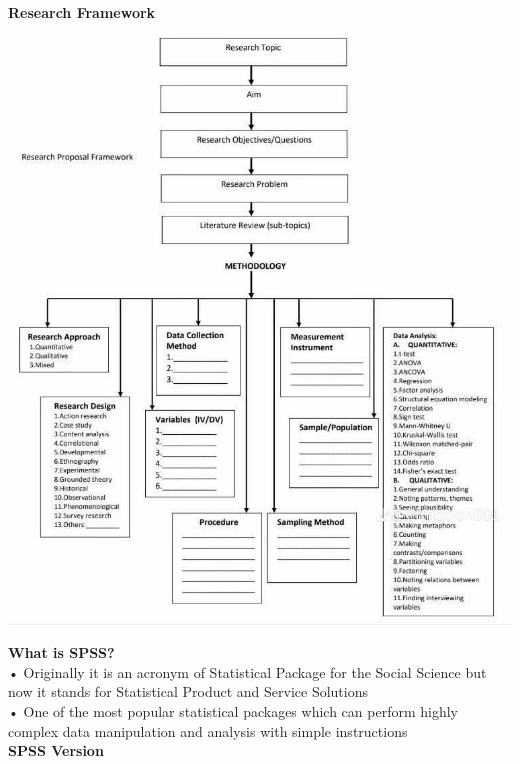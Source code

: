 \documentclass[
  letterpaper,
  DIV=11,
  numbers=noendperiod]{scrreprt}
\begin{document}
\textbf{Research Framework}\\

\includegraphics{images/framework.jpeg}

\textbf{What is SPSS?}\\

• Originally it is an acronym of Statistical Package for the Social
Science but now it stands for Statistical Product and Service
Solutions\\
• One of the most popular statistical packages which can perform highly
complex data manipulation and analysis with simple instructions\\

\textbf{SPSS Version}\\
\end{document}
